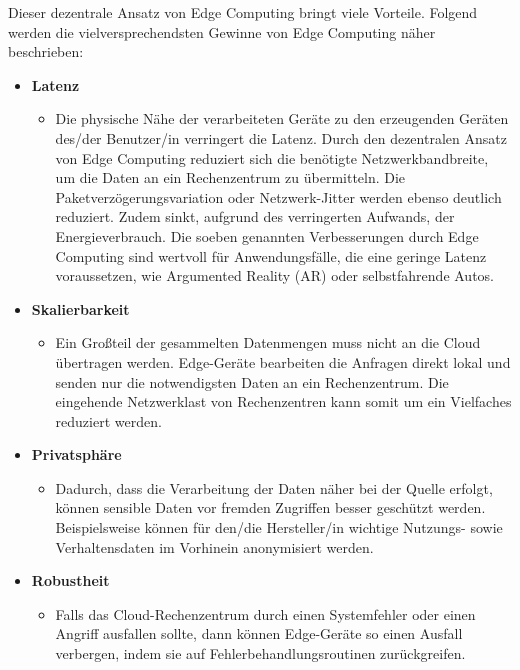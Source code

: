 \documentclass{sigchi}
\begin{document}
Dieser dezentrale Ansatz von Edge Computing bringt viele Vorteile. Folgend werden die vielversprechendsten Gewinne von Edge Computing näher beschrieben: \cite{promise-edge-computing:2016, emergence-edge-computing:2017}

\begin{itemize}
    \item \textbf{Latenz}
     \begin{itemize}
         \item Die physische Nähe der verarbeiteten Geräte zu den erzeugenden Geräten des/der Benutzer/in verringert die Latenz. Durch den dezentralen Ansatz von Edge Computing reduziert sich die benötigte Netzwerkbandbreite, um die Daten an ein Rechenzentrum zu übermitteln. Die Paketverzögerungsvariation oder Netzwerk-Jitter werden ebenso deutlich reduziert. Zudem sinkt, aufgrund des verringerten Aufwands, der Energieverbrauch. Die soeben genannten Verbesserungen durch Edge Computing sind wertvoll für Anwendungsfälle, die eine geringe Latenz voraussetzen, wie Argumented Reality (AR) oder selbstfahrende Autos.
     \end{itemize}
    \item \textbf{Skalierbarkeit}
         \begin{itemize}
            \item Ein Großteil der gesammelten Datenmengen muss nicht an die Cloud übertragen werden. Edge-Geräte bearbeiten die Anfragen direkt lokal und senden nur die notwendigsten Daten an ein Rechenzentrum. Die eingehende Netzwerklast von Rechenzentren kann somit um ein Vielfaches reduziert werden.
     \end{itemize}
    \item \textbf{Privatsphäre}
         \begin{itemize}
            \item Dadurch, dass die Verarbeitung der Daten näher bei der Quelle erfolgt, können sensible Daten vor fremden Zugriffen besser geschützt werden. Beispielsweise können für den/die Hersteller/in wichtige Nutzungs- sowie Verhaltensdaten im Vorhinein anonymisiert werden.
     \end{itemize}
    \item \textbf{Robustheit}
         \begin{itemize}
            \item Falls das Cloud-Rechenzentrum durch einen Systemfehler oder einen Angriff ausfallen sollte, dann können Edge-Geräte so einen Ausfall verbergen, indem sie auf Fehlerbehandlungsroutinen zurückgreifen.
        \end{itemize}
\end{itemize}
\end{document}
